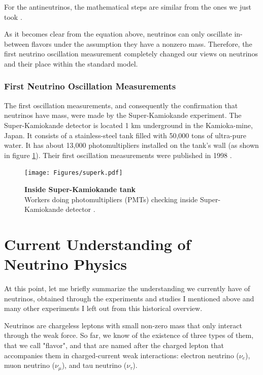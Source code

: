 For the antineutrinos, the mathematical steps are similar from the ones we just took \cite{oscillation_math}. 
 
As it becomes clear from the equation above, neutrinos can only oscillate in-between flavors under the assumption they have a nonzero mass. Therefore, the first neutrino oscillation measurement completely changed our views on neutrinos and their place within the standard model. 

\subsubsection{First Neutrino Oscillation Measurements}
The first oscillation measurements, and consequently the confirmation that neutrinos have mass, were made by the Super-Kamiokande experiment. The Super-Kamiokande detector is located 1 km underground in the Kamioka-mine, Japan. It consists of a stainless-steel tank filled with 50,000 tons of ultra-pure water. It has about 13,000 photomultipliers installed on the tank's wall (as shown in figure \ref{superk_picture}). Their first oscillation measurements were published in 1998 \cite{first_kamioka_measure}.

\begin{figure}[h!]
	\begin{center}
		\texttt{[image: Figures/superk.pdf]}
		\caption[Inside Super-Kamiokande tank]{ {\textbf{Inside Super-Kamiokande tank}}\\Workers doing photomultipliers (PMTs) checking inside Super-Kamiokande detector \cite{superk_picture}.}
		\label{superk_picture}	
	\end{center}
\end{figure}

\section{Current Understanding of Neutrino Physics}
At this point, let me briefly summarize the understanding we currently have of neutrinos, obtained through the experiments and studies I mentioned above and many other experiments I left out from this historical overview. 

Neutrinos are chargeless leptons with small non-zero mass that only interact through the weak force. So far, we know of the existence of three types of them, that we call "flavor", and that are named after the charged lepton that accompanies them in charged-current weak interactions: electron neutrino ($\nu_e$), muon neutrino ($\nu_{\mu}$), and tau neutrino ($\nu_{\tau}$). 

